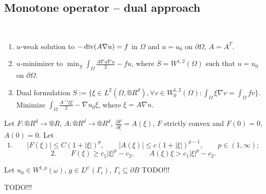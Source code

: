\documentclass[12pt]{article}					%
\begin{document}
\subsection{Monotone operator – dual approach}
\begin{poznamka}
	\ 
	\begin{enumerate}
		\item $u$-weak solution to $- \operatorname{div}(A \nabla u) = f$ in $Ω$ and $u = u_0$ on $\partial Ω$, $A = A^T$.
		\item $u$-minimizer to $\min_{\overline{S}} \int_Ω \frac{A \nabla u \nabla u}{2} - f u$, where $\overline{S} = W^{1, 2}(Ω)$ such that $u = u_0$ on $\partial Ω$.
		\item Dual formulation $S := \{ξ \in L^2(Ω, ®R^d), \forall v \in W_0^{1, 2}(Ω): \int_Ω ξ \nabla v = \int_Ω f v\}$. Minimize $\int_Ω \frac{A^{-1} ξ ξ}{2} - \nabla u_0 ξ$, where $ξ = A \nabla u$.
	\end{enumerate}
\end{poznamka}

\begin{veta}
	Let $F: ®R^d \rightarrow ®R$, $A: ®R^d \rightarrow ®R^d$, $\frac{\partial F}{\partial ξ} = A(ξ)$, $F$ strictly convex and $F(0) = 0$, $A(0) = 0$. Let
	$$ 1. \qquad |F(ξ)| ≤ C(1 + |ξ|)^p, \qquad |A(ξ)| ≤ c(1 + |ξ|)^{p - 1}, \qquad p \in (1, ∞); $$
	$$ 2. \qquad F(ξ) ≥ c_1|ξ|^p - c_2, \qquad A(ξ)ξ > c_1|ξ|^p - c_2. $$

	Let $u_0 \in W^{1, p}(ω)$, $g \in L^{p'}(Γ_i)$, $Γ_i \subseteq \partial B$ TODO!!!
\end{veta}


TODO!!!
\end{document}
